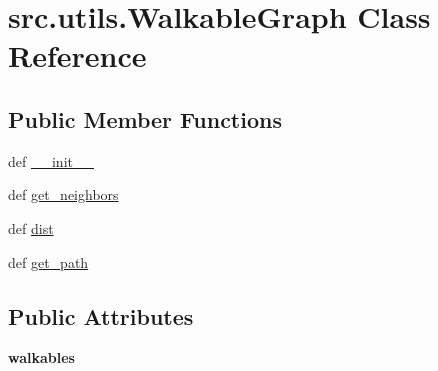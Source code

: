 \hypertarget{classsrc_1_1utils_1_1_walkable_graph}{\section{src.\-utils.\-Walkable\-Graph \-Class \-Reference}
\label{classsrc_1_1utils_1_1_walkable_graph}
}
\subsection*{\-Public \-Member \-Functions}
\begin{DoxyCompactItemize}
\item 
def \hyperlink{classsrc_1_1utils_1_1_walkable_graph_a61fad39577edd7672f9ff090ed8be884}{\-\_\-\-\_\-init\-\_\-\-\_\-}
\item 
def \hyperlink{classsrc_1_1utils_1_1_walkable_graph_a209beb8622e9c2fb742c6cbc77071d68}{get\-\_\-neighbors}
\item 
def \hyperlink{classsrc_1_1utils_1_1_walkable_graph_ab4f469cf0e73b91cd576d9526795ff70}{dist}
\item 
def \hyperlink{classsrc_1_1utils_1_1_walkable_graph_ae4a3c59b8bef04194e4f92f2e8f2b06b}{get\-\_\-path}
\end{DoxyCompactItemize}
\subsection*{\-Public \-Attributes}
\begin{DoxyCompactItemize}
\item 
\hypertarget{classsrc_1_1utils_1_1_walkable_graph_a1df908d75835d45e9304bc698186bbec}{{\bfseries walkables}}\label{classsrc_1_1utils_1_1_walkable_graph_a1df908d75835d45e9304bc698186bbec}

\end{DoxyCompactItemize}


